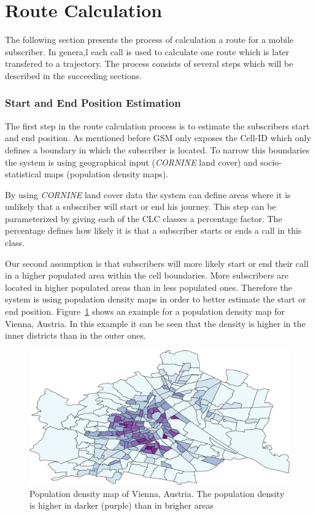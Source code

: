 \section{Route Calculation}
The following section presents the process of calculation a route for a mobile subscriber. In genera,l each call is used to calculate one route which is later transfered to a trajectory. The process consists of several steps which will be described in the succeeding sections.
\subsubsection{Start and End Position Estimation}
\label{sec:startandend}
The first step in the route calculation process is to estimate the subscribers start and end position. As mentioned before GSM only exposes the Cell-ID which only defines a boundary in which the subscriber is located. To narrow this boundaries the system is using geographical input (\emph{CORNINE} land cover) and socio-statistical maps (population density maps).

By using \emph{CORNINE} land cover data the system can define areas where it is unlikely that a subscriber will start or end his journey. This step can be parameterized by giving each of the CLC classes a percentage factor. The percentage defines how likely it is that a subscriber starts or ends a call in this class.

Our second assumption is that subscribers will more likely start or end their call in a higher populated area within the cell boundaries. More subscribers are located in higher populated areas than in less populated ones. Therefore the system is using population density maps in order to better estimate the start or end position. Figure~\ref{fig:pop_vienna} shows an example for a population density map for Vienna, Austria. In this example it can be seen that the density is higher in the inner districts than in the outer ones.
\begin{figure}
	\centering
	\includegraphics[width=0.7\linewidth]{./images/pop_vienna}
	\caption{Population density map of Vienna, Austria. The population density is higher in darker (purple) than in brigher areas}
	\label{fig:pop_vienna}
\end{figure}
